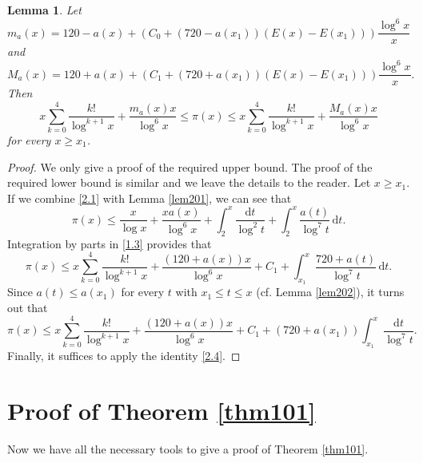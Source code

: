 \documentclass[a4paper,12pt]{amsart}
\newtheorem{lem}[thm]{Lemma}
\theoremstyle{definition}
\theoremstyle{remark}
\begin{document}
\begin{lem} \label{lem203}
Let
\begin{displaymath}
m_a(x) = 120 - a(x) + \left( C_0 + (720 - a(x_1))(E(x) - E(x_1)) \right) \frac{\log^6x}{x}
\end{displaymath}
and 
\begin{displaymath}
M_a(x) = 120 + a(x) + \left( C_1 + (720 + a(x_1))(E(x) - E(x_1)) \right) \frac{\log^6x}{x}.
\end{displaymath}
Then
\begin{displaymath}
x\sum_{k=0}^4 \frac{k!}{\log^{k+1}x} + \frac{m_a(x)x}{\log^6x} \leq \pi(x) \leq x\sum_{k=0}^4 \frac{k!}{\log^{k+1}x} + \frac{M_a(x)x}{\log^6x}
\end{displaymath}
for every $x \geq x_1$.
\end{lem}

\begin{proof}
We only give a proof of the required upper bound. The proof of the required lower bound is similar and we leave the details to the reader. Let $x \geq x_1$. If we combine \eqref{2.1} with Lemma \ref{lem201}, we can see that
\begin{displaymath}
\pi(x) \leq \frac{x}{\log x} + \frac{xa(x)}{\log^6x} + \int_2^x \frac{\text{d}t}{\log^2 t} + \int_2^x \frac{a(t)}{\log^7 t} \, \text{d}t.
\end{displaymath}
Integration by parts in \eqref{1.3} provides that
\begin{displaymath}
\pi(x) \leq x\sum_{k=0}^4 \frac{k!}{\log^{k+1}x} + \frac{(120+a(x))x}{\log^6x} + C_1 + \int_{x_1}^x \frac{720 + a(t)}{\log^7 t} \, \text{d}t.
\end{displaymath}
Since $a(t) \leq a(x_1)$ for every $t$ with $x_1 \leq t \leq x$ (cf. Lemma \ref{lem202}), it turns out that
\begin{displaymath}
\pi(x) \leq x\sum_{k=0}^4 \frac{k!}{\log^{k+1}x} + \frac{(120+a(x))x}{\log^6x} + C_1 + (720 + a(x_1))\int_{x_1}^x \frac{\text{d}t}{\log^7 t}.
\end{displaymath}
Finally, it suffices to apply the identity \eqref{2.4}.
\end{proof}

\section{Proof of Theorem \ref{thm101}}

Now we have all the necessary tools to give a proof of Theorem \ref{thm101}.
\end{document}

